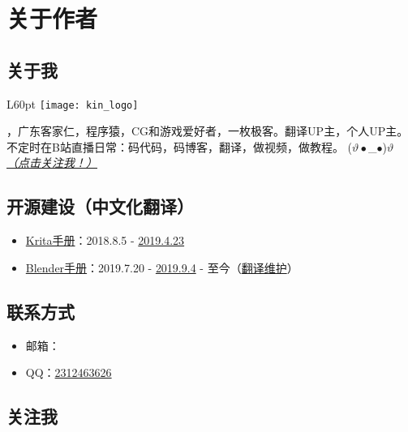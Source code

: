\chapter*{关于作者}

\section*{关于我}
\begin{wrapfigure}[3]{L}{60pt}
    \vspace*{-15pt}
    \centering
    \texttt{[image: kin\_logo]}
\end{wrapfigure}
\textbf{\the\AuthorName}，广东客家仁，程序猿，CG和游戏爱好者，一枚极客。翻译UP主，个人UP主。不定时在B站直播日常：码代码，码博客，翻译，做视频，做教程。 ($\vartheta\bullet$\_$\bullet$)$\vartheta$ \hyperlink{follow}{\emph{（点击关注我！）}}

\section*{开源建设（中文化翻译）}
\begin{itemize}
    \item \href{https://docs.krita.org/zh_CN/}{Krita手册}：2018.8.5 - \href{https://crowdin.com/profile}{2019.4.23}
    \item \href{https://docs.blender.org/manual/zh-hans/latest/}{Blender手册}：2019.7.20 - \href{https://www.blendercn.org/5812.html?tdsourcetag=s_pctim_aiomsg}{2019.9.4} - 至今（\href{https://developer.blender.org/p/Mr_Kin/}{翻译维护}）
\end{itemize}

\section*{\hypertarget{contact}{联系方式}}

\begin{itemize}
    \item 邮箱：\href{mailto:\the\AuthorEmail}{\the\AuthorEmail}
    \item QQ：\href{tencent://AddContact/?fromId=45&fromSubId=1&subcmd=all&uin=2312463626&website=www.oicqzone.com}{2312463626}
\end{itemize}

\section*{\hypertarget{follow}{关注我}}

